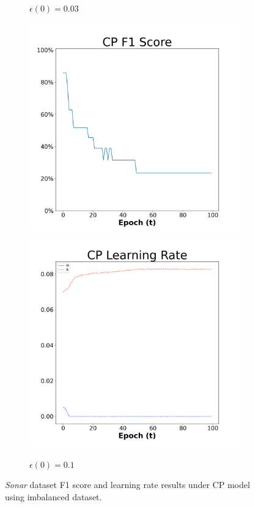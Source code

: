 \begin{figure}[H]
\begin{subfigure}{0.3\textwidth}
  \caption{$\epsilon(0)=0.03$}
\end{subfigure}\hfil %
\begin{subfigure}{0.3\textwidth}
  \includegraphics[width=\linewidth]{images/exper2/Sonar/CP_0.1_f1.png}
  \includegraphics[width=\linewidth]{images/exper2/Sonar/CP_0.1_lr.png}
  \caption{$\epsilon(0)=0.1$}
\end{subfigure}

\caption{\textit{Sonar} dataset F1 score and learning rate results under CP model using imbalanced dataset.}
\end{figure}


